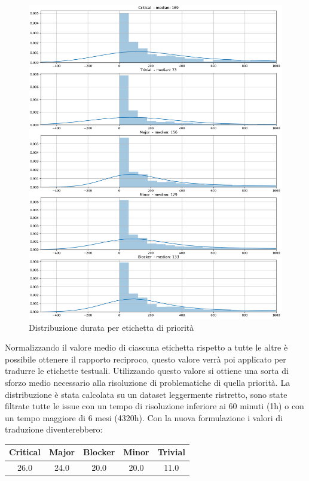 \documentclass[%
    corpo=12pt,
    twoside,
    oldstyle,
    autoretitolo,
    greek,
    evenboxes,
]{toptesi}
\begin{document}
\begin{figure}[!ht]
  \includegraphics[width=\linewidth]{figure/duration_distr.png}
  \caption{Distribuzione durata per etichetta di priorità}
  \label{fig:duration_distr}
\end{figure}
Normalizzando il valore medio di ciascuna etichetta rispetto a tutte le altre è possibile ottenere il rapporto reciproco, questo valore verrà poi applicato per tradurre le etichette testuali. Utilizzando questo valore si ottiene una sorta di sforzo medio necessario alla risoluzione di problematiche di quella priorità. La distribuzione è stata calcolata su un dataset leggermente ristretto, sono state filtrate tutte le issue con un tempo di risoluzione inferiore ai 60 minuti (1h) o con un tempo maggiore di 6 mesi (4320h).
Con la nuova formulazione i valori di traduzione diventerebbero:
\begin{center}
   \label{tab:priority_distr}
  \begin{tabular}{ |c|c|c|c|c| }
     \hline
     \textbf{Critical} & \textbf{Major} & \textbf{Blocker} & \textbf{Minor} & \textbf{Trivial} \\
     \hline
     \hline
     26.0 & 24.0 & 20.0 & 20.0 & 11.0 \\
     \hline
  \end{tabular}
\end{center}
\end{document}
